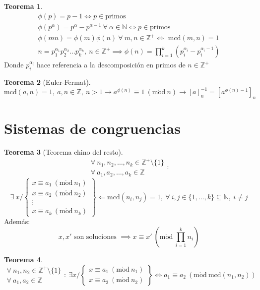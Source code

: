 \documentclass[10pt,a4paper]{article}
\theoremstyle{definition}
\newtheorem{theorem}{Teorema}[section]
\newcommand{\Mod}[1]{\ (\mathrm{m\acute od}\ #1)}
\begin{document}
\begin{theorem}
	\[
		\begin{array}{l}
				\phi(p) = p-1\iff p\in\text{primos}\\
				\phi(p^\alpha) = p^\alpha-p^{\alpha-1}\:\forall\:\alpha\in\mathbb{N}\iff p\in\text{primos}\\
				\phi(mn)=\phi(m)\phi(n)\:\forall\:m,n\in\mathbb{Z}^+\iff\text{ mcd}(m,n)=1\\
					n = p_1^{\alpha_1}p_2^{\alpha_2}\dots p_k^{\alpha_k},\:n\in\mathbb{Z}^+\implies \phi(n) = \prod_{i=1}^k(p_i^{\alpha_i}-p_i^{\alpha_i-1})		
				\end{array}\]
				Donde $p_i^{\alpha_i}$ hace referencia a la descomposición en primos de $n\in\mathbb{Z}^+$
\end{theorem}
\begin{theorem}[Euler-Fermat]
	\[\text{mcd}(a,n)=1,\:a,n\in\mathbb{Z},\:n>1\longrightarrow a^{\phi(n)}\equiv 1\Mod{n}\longrightarrow [a]_n^{-1}=[a^{\phi(n)-1}]_n\]
\end{theorem}

\section{Sistemas de congruencias}

\begin{theorem}[Teorema chino del resto]
	\[
		\begin{array}{l}
	\forall\:n_1,n_2,\dots,n_k\in\mathbb{Z}^+\setminus\{1\}\\\forall\:a_1,a_2,\dots,a_k\in\mathbb{Z}\end{array}:\]
	\[\exists\:x/\left\{\begin{array}{c}
		x\equiv a_1\Mod{n_1}\\
		x\equiv a_2\Mod{n_2}\\
		\vdots\\
		x\equiv a_k\Mod{n_k}
	\end{array}\right\}
	\Longleftarrow \text{mcd}(n_i, n_j)=1,\:\forall\:i,j\in\{1,\dots,k\}\subseteq\mathbb{N},\:i\neq j
\]
Además:
\[x,x'\text{ son soluciones }\implies x\equiv x'\Mod{\prod_{i=1}^kn_i}\]
\end{theorem}

\begin{theorem}
	\[\begin{array}{l}
		\forall\:n_1, n_2\in\mathbb{Z}^+\setminus\{1\}\\
		\forall\:a_1,a_2\in\mathbb{Z}
		\end{array}:\:\exists x/\left\{\begin{array}{c}
			x\equiv a_1\Mod{n_1}\\
	x\equiv a_2\Mod{n_2}\end{array}
\right\}\iff a_1\equiv a_2\Mod{\text{mcd}(n_1,n_2)}
	\]
\end{theorem}
\end{document}
